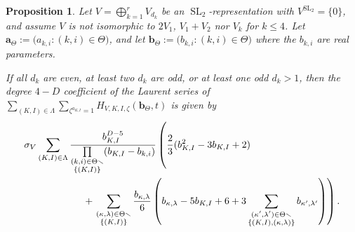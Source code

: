 \documentclass{amsart}
\newtheorem{proposition}[theorem]{Proposition}
\theoremstyle{definition}
\theoremstyle{remark}
\newcommand{\SL}{\operatorname{SL}}
\newcommand{\bs}{\boldsymbol}
\begin{document}
\begin{proposition}
\label{prop:Gamma1First}
Let $V = \bigoplus_{k=1}^r V_{d_k}$ be an $\SL_2$-representation with $V^{\SL_2} = \{0\}$,
and assume $V$ is not isomorphic to $2V_1$, $V_1+V_2$ nor $V_k$ for $k \leq 4$.
Let $\bs{a}_\Theta := \big(a_{k,i} : (k,i)\in\Theta\big)$, and let
$\bs{b}_\Theta := \big(b_{k,i} : (k,i)\in\Theta\big)$ where the $b_{k,i}$ are
real parameters.

If all $d_k$ are even, at least two $d_k$ are odd, or at least one odd $d_k > 1$, then the degree $4-D$ coefficient
of the Laurent series of $\sum_{(K,I)\in\Lambda} \sum_{\zeta^{a_{K,I}} = 1} H_{V,K,I,\zeta}(\bs{b}_\Theta,t)$ is given by
\begin{align}
\label{eq:Gamma1FirstCase1}
    &\sigma_V\sum\limits_{(K,I)\in\Lambda}
        \frac{b_{K,I}^{D-5}}
        {\prod\limits_{\substack{(k,i)\in\Theta\smallsetminus \\ \{(K,I)\}}} (b_{K,I} - b_{k,i})}
        \left(
        \vphantom{\sum\limits_{\substack{(\kappa^\prime,\lambda^\prime)\in\Theta\smallsetminus
                            \\ \{(K,I),(\kappa,\lambda)\}}} b_{\kappa^\prime,\lambda^\prime}}
        \frac{2}{3} (b_{K,I}^2 - 3b_{K,I} + 2)
                \right.
                \\ \nonumber &\quad\quad\quad\quad\quad\quad + \left.
                \sum\limits_{\substack{(\kappa,\lambda)\in\Theta\smallsetminus \\ \{(K,I)\}}}
                    \frac{b_{\kappa,\lambda}}{6} \left(
                        b_{\kappa,\lambda} - 5b_{K,I} + 6 + 3
                    \sum\limits_{\substack{(\kappa^\prime,\lambda^\prime)\in\Theta\smallsetminus
                            \\ \{(K,I),(\kappa,\lambda)\}}} b_{\kappa^\prime,\lambda^\prime}
        \right)\right).
\end{align}


\end{proposition}
\end{document}
